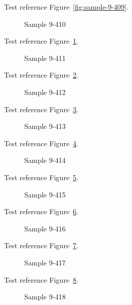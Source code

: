 Test reference Figure~\ref{fig:sample-9-409}.

\begin{figure}[tbhp]
\caption{Sample 9-410}
\label{fig:sample-9-410}
\end{figure}

Test reference Figure~\ref{fig:sample-9-410}.

\begin{figure}[tbhp]
\caption{Sample 9-411}
\label{fig:sample-9-411}
\end{figure}

Test reference Figure~\ref{fig:sample-9-411}.

\begin{figure}[tbhp]
\caption{Sample 9-412}
\label{fig:sample-9-412}
\end{figure}

Test reference Figure~\ref{fig:sample-9-412}.

\begin{figure}[tbhp]
\caption{Sample 9-413}
\label{fig:sample-9-413}
\end{figure}

Test reference Figure~\ref{fig:sample-9-413}.

\begin{figure}[tbhp]
\caption{Sample 9-414}
\label{fig:sample-9-414}
\end{figure}

Test reference Figure~\ref{fig:sample-9-414}.

\begin{figure}[tbhp]
\caption{Sample 9-415}
\label{fig:sample-9-415}
\end{figure}

Test reference Figure~\ref{fig:sample-9-415}.

\begin{figure}[tbhp]
\caption{Sample 9-416}
\label{fig:sample-9-416}
\end{figure}

Test reference Figure~\ref{fig:sample-9-416}.

\begin{figure}[tbhp]
\caption{Sample 9-417}
\label{fig:sample-9-417}
\end{figure}

Test reference Figure~\ref{fig:sample-9-417}.

\begin{figure}[tbhp]
\caption{Sample 9-418}
\label{fig:sample-9-418}
\end{figure}

